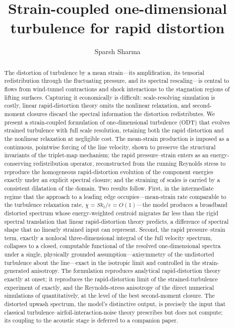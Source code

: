 \documentclass[lineno]{JFM-FLM_Au}
\title{Strain-coupled one-dimensional turbulence for rapid distortion}
\author{Sparsh Sharma\aff{1}}
\affiliation{\aff{1}German Aerospace Center (DLR), 38108 Braunschweig, Germany}
\newcounter{assumption}
\begin{document}
\maketitle


\begin{abstract}
The distortion of turbulence by a mean strain---its amplification, its
tensorial redistribution through the fluctuating pressure, and its spectral
rescaling---is central to flows from wind-tunnel contractions and shock
interactions to the stagnation regions of lifting surfaces. Capturing it
economically is difficult: scale-resolving simulation is costly, linear
rapid-distortion theory omits the nonlinear relaxation, and second-moment
closures discard the spectral information the distortion redistributes. We
present a strain-coupled formulation of one-dimensional turbulence (ODT) that
evolves strained turbulence with full scale resolution, retaining both the rapid
distortion and the nonlinear relaxation at negligible cost. The mean-strain
production is imposed as a continuous, pointwise forcing of the line velocity,
shown to preserve the structural invariants of the triplet-map mechanism; the
rapid pressure--strain enters as an energy-conserving redistribution operator,
reconstructed from the running Reynolds stress to reproduce the homogeneous
rapid-distortion evolution of the component energies exactly under an explicit
spectral closure; and the straining of scales is carried by a consistent
dilatation of the domain. Two results follow. First, in the intermediate regime
that the approach to a leading edge occupies---mean-strain rate comparable to the
turbulence relaxation rate, $\chi = S k_t/\varepsilon = O(1)$---the model produces
a broadband distorted spectrum whose energy-weighted centroid migrates far less
than the rigid spectral translation that linear rapid-distortion theory predicts,
a difference of spectral shape that no linearly strained input can represent.
Second, the rapid pressure--strain term, exactly a nonlocal three-dimensional
integral of the full velocity spectrum, collapses to a closed, computable
functional of the resolved one-dimensional spectra under a single, physically
grounded assumption---axisymmetry of the undistorted turbulence about the
line---exact in the isotropic limit and controlled in the strain-generated
anisotropy. The formulation reproduces analytical rapid-distortion theory exactly
at onset; it reproduces the rapid-distortion limit of the strained-turbulence
experiment of \citet{Chen2006} exactly, and the Reynolds-stress anisotropy of the
direct numerical simulations of \citet{LeeReynolds1985} quantitatively, at the
level of the best second-moment closure. The distorted upwash spectrum, the
model's distinctive output, is precisely the input that classical
turbulence--airfoil-interaction-noise theory prescribes but does not compute; its
coupling to the acoustic stage is deferred to a companion paper.
\end{abstract}
\end{document}
